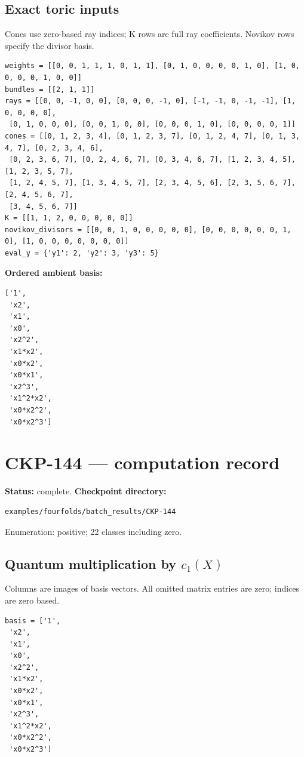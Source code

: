 \documentclass[10pt,a4paper]{article}
\begin{document}
\subsection*{Exact toric inputs}
Cones use zero-based ray indices; K rows are full ray coefficients. Novikov rows specify the divisor basis.

\begin{lstlisting}
weights = [[0, 0, 1, 1, 1, 0, 1, 1], [0, 1, 0, 0, 0, 0, 1, 0], [1, 0, 0, 0, 0, 1, 0, 0]]
bundles = [[2, 1, 1]]
rays = [[0, 0, -1, 0, 0], [0, 0, 0, -1, 0], [-1, -1, 0, -1, -1], [1, 0, 0, 0, 0],
 [0, 1, 0, 0, 0], [0, 0, 1, 0, 0], [0, 0, 0, 1, 0], [0, 0, 0, 0, 1]]
cones = [[0, 1, 2, 3, 4], [0, 1, 2, 3, 7], [0, 1, 2, 4, 7], [0, 1, 3, 4, 7], [0, 2, 3, 4, 6],
 [0, 2, 3, 6, 7], [0, 2, 4, 6, 7], [0, 3, 4, 6, 7], [1, 2, 3, 4, 5], [1, 2, 3, 5, 7],
 [1, 2, 4, 5, 7], [1, 3, 4, 5, 7], [2, 3, 4, 5, 6], [2, 3, 5, 6, 7], [2, 4, 5, 6, 7],
 [3, 4, 5, 6, 7]]
K = [[1, 1, 2, 0, 0, 0, 0, 0]]
novikov_divisors = [[0, 0, 1, 0, 0, 0, 0, 0], [0, 0, 0, 0, 0, 0, 1, 0], [1, 0, 0, 0, 0, 0, 0, 0]]
eval_y = {'y1': 2, 'y2': 3, 'y3': 5}
\end{lstlisting}

\textbf{Ordered ambient basis:}
\begin{lstlisting}
['1',
 'x2',
 'x1',
 'x0',
 'x2^2',
 'x1*x2',
 'x0*x2',
 'x0*x1',
 'x2^3',
 'x1^2*x2',
 'x0*x2^2',
 'x0*x2^3']
\end{lstlisting}

\clearpage\section*{CKP-144 --- computation record}
\textbf{Status:} complete.
\textbf{Checkpoint directory:}
\begin{lstlisting}
examples/fourfolds/batch_results/CKP-144
\end{lstlisting}

Enumeration: positive; 22 classes including zero.
\subsection*{Quantum multiplication by $c_1(X)$}
Columns are images of basis vectors. All omitted matrix entries are zero; indices are zero based.

\begin{lstlisting}
basis = ['1',
 'x2',
 'x1',
 'x0',
 'x2^2',
 'x1*x2',
 'x0*x2',
 'x0*x1',
 'x2^3',
 'x1^2*x2',
 'x0*x2^2',
 'x0*x2^3']
\end{lstlisting}
\end{document}
